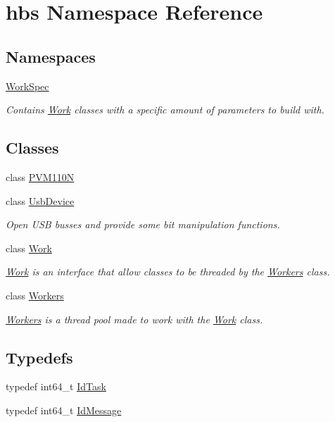 \hypertarget{namespacehbs}{\section{hbs Namespace Reference}
\label{namespacehbs}
}
\subsection*{Namespaces}
\begin{DoxyCompactItemize}
\item 
\hyperlink{namespacehbs_1_1_work_spec}{Work\-Spec}
\begin{DoxyCompactList}\small\item\em Contains \hyperlink{classhbs_1_1_work}{Work} classes with a specific amount of parameters to build with. \end{DoxyCompactList}\end{DoxyCompactItemize}
\subsection*{Classes}
\begin{DoxyCompactItemize}
\item 
class \hyperlink{classhbs_1_1_p_v_m110_n}{P\-V\-M110\-N}
\item 
class \hyperlink{classhbs_1_1_usb_device}{Usb\-Device}
\begin{DoxyCompactList}\small\item\em Open U\-S\-B busses and provide some bit manipulation functions. \end{DoxyCompactList}\item 
class \hyperlink{classhbs_1_1_work}{Work}
\begin{DoxyCompactList}\small\item\em \hyperlink{classhbs_1_1_work}{Work} is an interface that allow classes to be threaded by the \hyperlink{classhbs_1_1_workers}{Workers} class. \end{DoxyCompactList}\item 
class \hyperlink{classhbs_1_1_workers}{Workers}
\begin{DoxyCompactList}\small\item\em \hyperlink{classhbs_1_1_workers}{Workers} is a thread pool made to work with the \hyperlink{classhbs_1_1_work}{Work} class. \end{DoxyCompactList}\end{DoxyCompactItemize}
\subsection*{Typedefs}
\begin{DoxyCompactItemize}
\item 
typedef int64\-\_\-t \hyperlink{namespacehbs_aab8d06205ac2b0b14186327fd6c1c0d6}{Id\-Task}
\item 
typedef int64\-\_\-t \hyperlink{namespacehbs_a6d744a52db9bca0a9752a009118641f4}{Id\-Message}
\end{DoxyCompactItemize}
